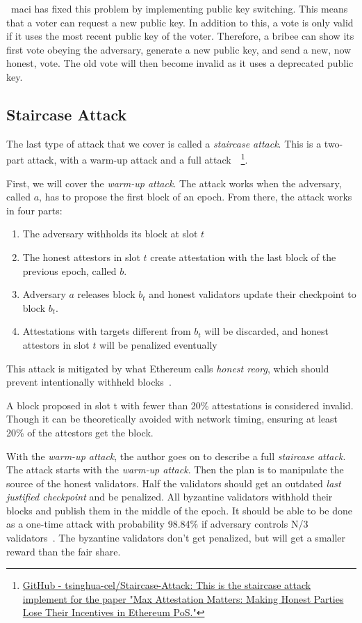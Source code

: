 ~\gls{maci} has fixed this problem by implementing public key switching.
This means that a voter can request a new public key.
In addition to this, a vote is only valid if it uses the most recent public key of the voter.
Therefore, a bribee can show its first vote obeying the adversary,
generate a new public key, and send a new, now honest, vote.
The old vote will then become invalid as it uses a deprecated public key.

\subsection{Staircase Attack}\label{subsec:staircase-attack}
The last type of attack that we cover is called a \textit{staircase attack}.
This is a two-part attack, with a warm-up attack and a full attack~\cite{cryptoeprint:2023/1622}~\footnote{
\href{https://github.com/tsinghua-cel/Staircase-Attack}{GitHub - tsinghua-cel/Staircase-Attack: This is the staircase attack implement for the paper "Max Attestation Matters: Making Honest Parties Lose Their Incentives in Ethereum PoS."}}.

First, we will cover the \textit{warm-up attack}.
The attack works when the adversary, called $a$, has to propose the first block of an epoch.
From there, the attack works in four parts:
\begin{enumerate}
    \item The adversary withholds its block at slot $t$
    \item The honest attestors in slot $t$ create attestation with the last block of the previous epoch, called $b$.
    \item Adversary $a$ releases block $b_t$ and honest validators update their checkpoint to block $b_t$.
    \item Attestations with targets different from $b_t$ will be discarded,
    and honest attestors in slot $t$ will be penalized eventually
\end{enumerate}

This attack is mitigated by what Ethereum calls \textit{honest reorg},
which should prevent intentionally withheld blocks~\cite{cryptoeprint:2023/1622}.

A block proposed in slot t with fewer than 20\% attestations is considered invalid.
Though it can be theoretically avoided with network timing, ensuring at least 20\% of the attestors get the block.


With the \textit{warm-up attack}, the author goes on to describe a full \textit{staircase attack}.
The attack starts with the \textit{warm-up attack}.
Then the plan is to manipulate the source of the honest validators.
Half the validators should get an outdated \textit{last justified checkpoint} and be penalized.
All byzantine validators withhold their blocks and publish them in the middle of the epoch.
It should be able
to be done as a one-time attack with probability 98.84\%
if adversary controls N/3 validators~\cite{cryptoeprint:2023/1622}.
The byzantine validators don't get penalized, but will get a smaller reward than the fair share.


